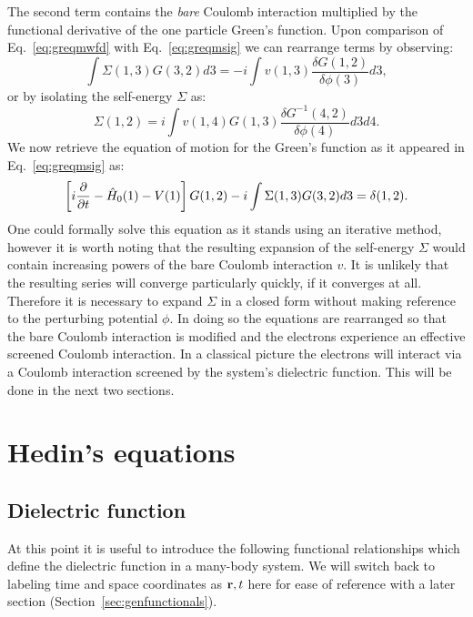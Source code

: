 The second term contains the \emph{bare} Coulomb interaction 
multiplied by the functional derivative of the 
one particle Green's function. Upon comparison of 
Eq.~\ref{eq:greqmwfd} with Eq.~\ref{eq:greqmsig} we can 
rearrange terms by observing:
%
\begin{equation}
\int \Sigma(1,3)G(3,2)d3 = -i\int v(1,3) \frac{\delta G(1,2)}{\delta \phi(3)}d3,
\end{equation}
%
or by isolating the self-energy $\Sigma$ as: %
%
\begin{equation}
\label{eq:sigma}
\Sigma(1,2) = i \int v(1,4) G(1,3) \frac{\delta G^{-1}(4,2)}{\delta\phi(4)}d3d4.
\end{equation}
%
We now retrieve the equation of motion for the Green's function 
as it appeared in Eq.~\ref{eq:greqmsig} as:
%
\begin{equation}
\label{eq:greqmsig2}
\left[i\frac{\partial}{\partial t} - \hat{H}_{0}(1) - V(1)\right]G(1,2) - i\int \Sigma(1,3)G(3,2)d3 = \delta(1,2).
\end{equation}
%
One could formally solve this equation as it stands using an iterative method, 
however it is worth noting that the resulting expansion of the self-energy $\Sigma$ 
would contain increasing powers of the bare Coulomb interaction $v$. 
It is unlikely that the resulting series will converge particularly 
quickly, if it converges at all. 
%
Therefore it is necessary to expand $\Sigma$ in a closed form without making 
reference to the perturbing potential $\phi$. In doing so the equations are rearranged so that
the bare Coulomb interaction is modified and the electrons experience 
an effective screened Coulomb interaction. In a classical picture the electrons will interact
via a Coulomb interaction screened by the system's dielectric function. 
This will be done in the next two sections.
%
\section{Hedin's equations}
\subsection{Dielectric function}
\label{sec:dielecfun}
\noindent
At this point it is useful to introduce the following functional relationships 
which define the dielectric function in a many-body system.
We will switch back to labeling time and space coordinates as ${\bf r},t$ 
here for ease of reference with a later section (Section~\ref{sec:genfunctionals}). 

